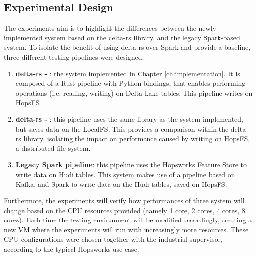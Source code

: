 \subsection{Experimental Design}
%

The experiments aim is to highlight the differences between the newly implemented system based on the delta-rs library, and the legacy Spark-based system. To isolate the benefit of using delta-rs over Spark and provide a baseline, three different testing pipelines were designed:
\begin{enumerate}
    \item \textbf{delta-rs - }: the system implemented in Chapter \ref{ch:implementation}. It is composed of a Rust pipeline with Python bindings, that enables performing operations (i.e. reading, writing) on Delta Lake tables. This pipeline writes on \gls{HopsFS}.
    \item \textbf{delta-rs - }: this pipeline uses the same library as the system implemented, but saves data on the \gls{LocalFS}. This provides a comparison within the delta-rs library, isolating the impact on performance caused by writing on \gls{HopsFS}, a distributed file system.
    \item \textbf{Legacy Spark pipeline}: this pipeline uses the Hopsworks Feature Store to write data on Hudi tables. This system makes use of a pipeline based on Kafka, and Spark to write data on the Hudi tables, saved on \gls{HopsFS}. 
\end{enumerate}

Furthermore, the experiments will verify how performances of three system will change based on the \gls{CPU} resources provided (namely 1 core, 2 cores, 4 cores, 8 cores). Each time the testing environment will be modified accordingly, creating a new \gls{VM} where the experiments will run with increasingly more resources. These \gls{CPU} configurations were chosen together with the industrial supervisor, according to the typical Hopsworks use case.

